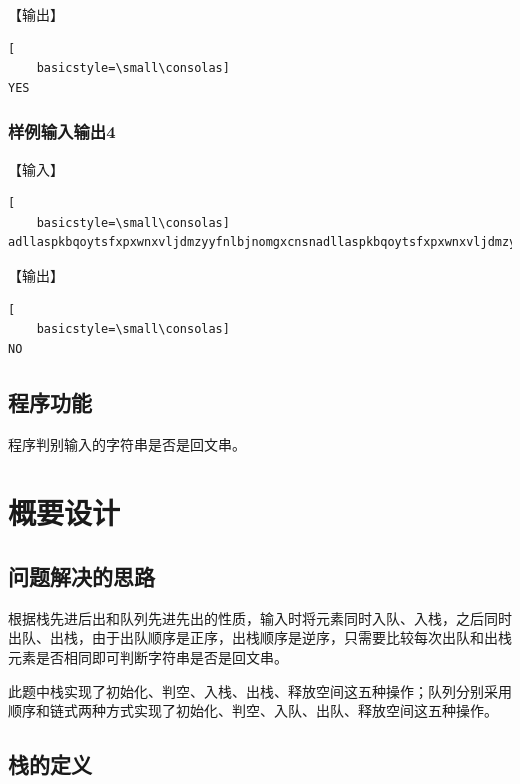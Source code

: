 \documentclass{article}
\begin{document}
【输出】

\begin{lstlisting}[
    basicstyle=\small\consolas]
YES
\end{lstlisting}

\subsubsection{样例输入输出4}

【输入】

\begin{lstlisting}[
    basicstyle=\small\consolas]
adllaspkbqoytsfxpxwnxvljdmzyyfnlbjnomgxcnsnadllaspkbqoytsfxpxwnxvljdmzyyfnlbjnomgxcnsn#
\end{lstlisting}

【输出】

\begin{lstlisting}[
    basicstyle=\small\consolas]
NO
\end{lstlisting}

\subsection{程序功能}

程序判别输入的字符串是否是回文串。

\section{概要设计}

\subsection{问题解决的思路}

根据栈先进后出和队列先进先出的性质，输入时将元素同时入队、入栈，之后同时出队、出栈，由于出队顺序是正序，出栈顺序是逆序，只需要比较每次出队和出栈元素是否相同即可判断字符串是否是回文串。

此题中栈实现了初始化、判空、入栈、出栈、释放空间这五种操作；队列分别采用顺序和链式两种方式实现了初始化、判空、入队、出队、释放空间这五种操作。

\subsection{栈的定义}
\end{document}
